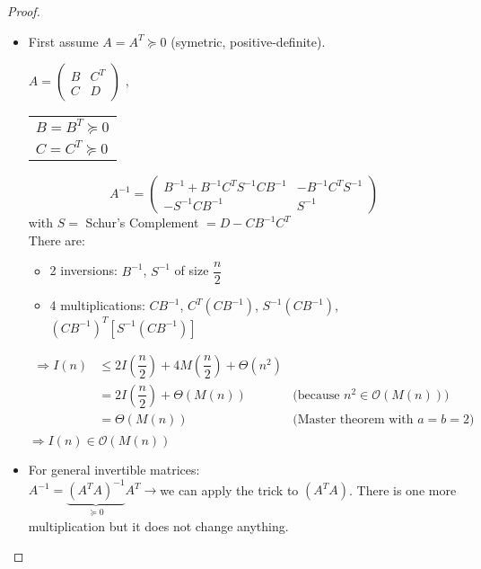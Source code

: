 \begin{proof}
\begin{enumerate}
\begin{itemize}
\item  First assume $A=A^T\succcurlyeq 0$ (symetric, positive-definite).\\
\begin{center}
$A=\begin{pmatrix}
B & C^T\\
C & D
\end{pmatrix}$ \hspace*{1cm},\hspace*{1cm}
\begin{tabular}{l}
$B=B^T\succcurlyeq 0$\\
$C=C^T\succcurlyeq 0$
\end{tabular}
\end{center}
$$A^{-1}=\begin{pmatrix}
B^{-1}+B^{-1}C^TS^{-1}CB^{-1} & -B^{-1}C^TS^{-1}\\
-S^{-1}CB^{-1} & S^{-1}
\end{pmatrix}$$
with $S=$ Schur's Complement $=D-CB^{-1}C^T$\\
There are:
\begin{itemize}
\item 2 inversions: $B^{-1}$, $S^{-1}$ of size $\dfrac{n}{2}$
\item 4 multiplications: $CB^{-1}$, $C^T (CB^{-1})$, $S^{-1}(CB^{-1})$, $(CB^{-1})^T\left[S^{-1}(CB^{-1})\right]$
\end{itemize}
\begin{align*}
\Rightarrow I(n) &\leq 2I(\dfrac{n}{2})+4M(\dfrac{n}{2})+\Theta(n^2)&\\
&=2I\left(\dfrac{n}{2}\right)+\Theta(M(n))&\text{(because }n^2\in \mathcal{O}(M(n)))\\
&=\Theta(M(n))&\text{(Master theorem with } a=b=2)\\
\end{align*}
$\Rightarrow I(n)\in \mathcal{O}(M(n))$\\

\item For general invertible matrices:\\
\hspace*{2cm} $A^{-1}=\underbrace{(A^TA)^{-1}}\limits_{\succcurlyeq 0}A^T\rightarrow$we can apply the trick to $(A^TA)$. There is one more multiplication but it does not change anything.
\end{itemize}
\end{enumerate}
\end{proof}

